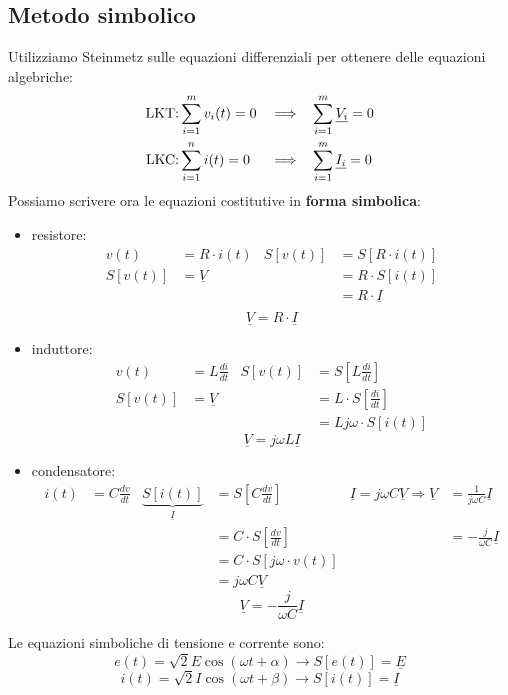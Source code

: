 \documentclass{article}
\begin{document}
\subsection{Metodo simbolico}
Utilizziamo Steinmetz sulle equazioni differenziali per ottenere delle equazioni algebriche:
\begin{align*}
    \text{LKT:}&\sum_{i=1}^m v_i(t)=0 & &\Longrightarrow & &\sum_{i=1}^m \underline{V_i}=0\\
    \text{LKC:}&\sum_{i=1}^n i(t)=0 & &\Longrightarrow &  &\sum_{i=1}^m \underline{I_i}=0
\end{align*}
Possiamo scrivere ora le equazioni costitutive in \textbf{forma simbolica}:
\begin{itemize}
    \item resistore: 
    \begin{align*}
        v(t) &=R \cdot i(t) & S[v(t)] &= S[R \cdot i(t)] \\
        S[v(t)] &= \underline{V} & &=R\cdot S[i(t)]\\
        & & &=R \cdot \underline{I}\\
    \end{align*}
    \[\underline{V} = R \cdot \underline{I}\]
    \item induttore:
    \begin{align*}
        v(t) &= L \frac{di}{dt} & S[v(t)] &= S\left[L \frac{di}{dt}\right] \\
        S[v(t)] &= \underline{V} & &=L \cdot S\left[\frac{di}{dt}\right]\\
        & & &=Lj \omega \cdot  S \left[i(t)\right]
    \end{align*}
    \[\underline{V}=j \omega L \underline{I}\]
    \item condensatore:
    \begin{align*}
        i(t) &= C \frac{dv}{dt} &
        \underbrace{S[i(t)]}_{\underline{I}} &= S\left[C \frac{dv}{dt}\right] & \underline{I} = j\omega C \underline{V} \Longrightarrow \underline{V} &= \frac{1}{j \omega C}\underline{I} \\
        & & &=C \cdot S\left[\frac{dv}{dt}\right] & &= - \frac{j}{\omega C}\underline{I}\\
        & & &= C \cdot S\left[j \omega \cdot v(t)\right]\\
        & & &= j \omega C \underline{V}
    \end{align*}
    \[\underline{V} = - \frac{j}{\omega C}\underline{I}\]
\end{itemize}
Le equazioni simboliche di tensione e corrente sono:
\[
    e(t) = \sqrt{2}E \cos(\omega t + \alpha) \longrightarrow S[e(t)] = \underline{E}
\]
\[
    i(t) = \sqrt{2} I \cos(\omega t + \beta) \longrightarrow S[i(t)] = \underline{I}
\]
\end{document}
